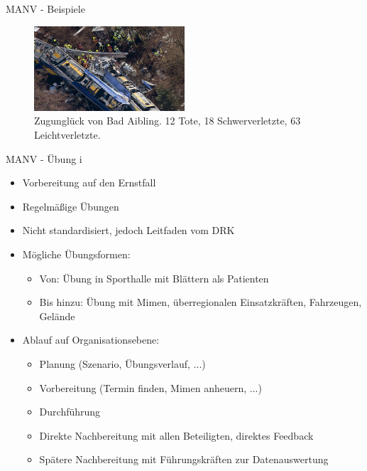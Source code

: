 \begin{frame}{MANV - Beispiele}
	\begin{figure}
		\begin{center}
			\includegraphics[width=0.5\textwidth]{images/bad-aibling.jpg}
		\end{center}
		\caption{Zugunglück von Bad Aibling. 12 Tote, 18 Schwerverletzte, 63 Leichtverletzte.\cite{manv-badaibling}}\label{fig:badaibling}
	\end{figure}
\end{frame}


\begin{frame}{MANV - Übung i}
	\begin{itemize}
		\item Vorbereitung auf den Ernstfall
		\item Regelmäßige Übungen
		\item Nicht standardisiert, jedoch Leitfaden vom DRK \cite{kreuz2016durchfuhrung}
		\item Mögliche Übungsformen:
		      \begin{itemize}
			      \item Von: Übung in Sporthalle mit Blättern als Patienten
			      \item Bis hinzu: Übung mit Mimen, überregionalen Einsatzkräften, Fahrzeugen, Gelände
		      \end{itemize}
		\item Ablauf auf Organisationsebene:
		      \begin{itemize}
			      \item Planung (Szenario, Übungsverlauf, ...)
			      \item Vorbereitung (Termin finden, Mimen anheuern, ...)
			      \item Durchführung
			      \item Direkte Nachbereitung mit allen Beteiligten, direktes Feedback
			      \item Spätere Nachbereitung mit Führungskräften zur Datenauswertung
		      \end{itemize}
	\end{itemize}

\end{frame}

